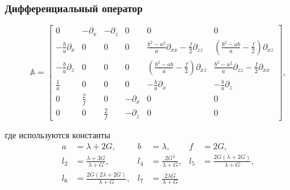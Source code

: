 \begin{frame}
    \frametitle{Дифференциальный оператор}
    \begin{equation*}
        \mathbb{A} = 
        \left[\begin{array}{cccccc}
            0                      & -\partial_x & -\partial_z & 0 & 0 & 0 \\
            -\frac{b}{a}\partial_x & 0           & 0 & 0 & \frac{b^2-a^2}{a}\partial_{xx} - \frac{f}{2}\partial_{zz} & \left( \frac{b^2-ab}{a} - \frac{f}{2} \right) \partial_{xz} \\
            -\frac{b}{a}\partial_z & 0           & 0 & 0 & \left( \frac{b^2-ab}{a} - \frac{f}{2} \right) \partial_{xz} & \frac{b^2-a^2}{a}\partial_{zz} - \frac{f}{2}\partial_{xx} \\
            \frac{1}{a}            & 0           & 0 & 0 & -\frac{b}{a}\partial_x & -\frac{b}{a}\partial_z \\
            0                      & \frac{2}{f} & 0 & -\partial_x & 0 & 0 \\
            0                      & 0           & \frac{2}{f} & -\partial_z & 0 & 0 
        \end{array}\right],
    \end{equation*}
    
    где используются константы
    \begin{align*}
        a   & = \lambda + 2G,                          & b   & = \lambda,                &     f & = 2G, \\
        l_2 & = \frac{\lambda + 3G}{\lambda + G},      & l_4 & = \frac{2G^2}{\lambda+G}, &   l_5 & = \frac{2G(\lambda + 2G)}{\lambda + G}, \\
        l_6 & = \frac{2G(2\lambda + 2G)}{\lambda + G}, & l_7 & = \frac{2\lambda G}{\lambda+G}
    \end{align*}
\end{frame}

